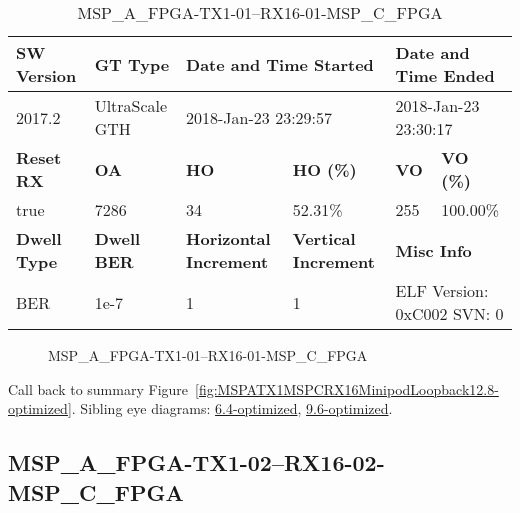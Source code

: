 \begin{table}[h]
\centering
\caption{MSP\_A\_FPGA-TX1-01--RX16-01-MSP\_C\_FPGA}
\label{tab:MSPAFPGATX101RX1601MSPCFPGA12.8-optimized}
\begin{tabular}{@{}|l|l|l|l|l|l|@{}}
\toprule
\textbf{SW Version}                & \textbf{GT Type}   & \multicolumn{2}{l|}{\textbf{Date and Time Started}}            & \multicolumn{2}{l|}{\textbf{Date and Time Ended}}        \\ \midrule
2017.2                       & UltraScale GTH          & \multicolumn{2}{l|}{2018-Jan-23 23:29:57}                   & \multicolumn{2}{l|}{2018-Jan-23 23:30:17}               \\ \midrule
\textbf{Reset RX}                  & \textbf{OA} & \textbf{HO}   & \textbf{HO (\%)} & \textbf{VO} & \textbf{VO (\%)} \\ \midrule
true & 7286        & 34          & 52.31\%        & 255        & 100.00\%       \\ \midrule
\textbf{Dwell Type}                & \textbf{Dwell BER} & \textbf{Horizontal Increment} & \textbf{Vertical Increment}    & \multicolumn{2}{l|}{\textbf{Misc Info}}                  \\ \midrule
BER                            & 1e-7        & 1        & 1           & \multicolumn{2}{l|}{ELF Version: 0xC002 SVN: 0}                         \\ \bottomrule
\end{tabular}
\end{table}

\begin{figure}[h]
\caption{MSP\_A\_FPGA-TX1-01--RX16-01-MSP\_C\_FPGA} \label{fig:MSPAFPGATX101RX1601MSPCFPGA12.8-optimized}
\end{figure}

Call back to summary Figure~\ref{fig:MSPATX1MSPCRX16MinipodLoopback12.8-optimized}.
Sibling eye diagrams: \hyperref[sec:MSPAFPGATX101RX1601MSPCFPGA6.4-optimized]{6.4-optimized}, \hyperref[sec:MSPAFPGATX101RX1601MSPCFPGA9.6-optimized]{9.6-optimized}.

\clearpage
\newpage


\subsection{MSP\_A\_FPGA-TX1-02--RX16-02-MSP\_C\_FPGA}\label{sec:MSPAFPGATX102RX1602MSPCFPGA12.8-optimized}

